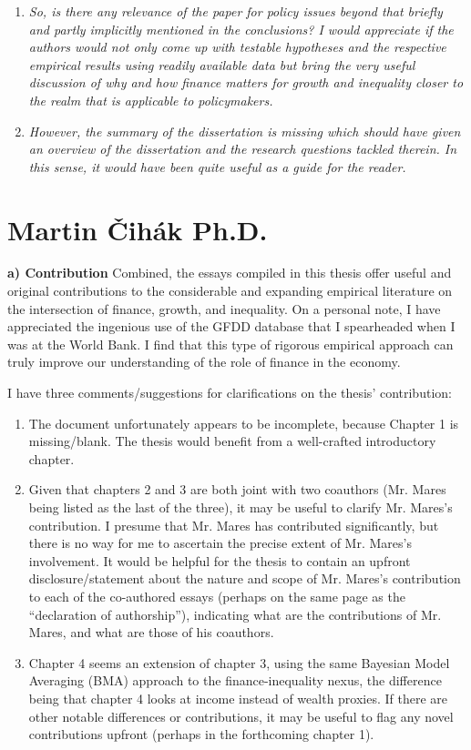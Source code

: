 \begin{enumerate}
    \item \textit{So, is there any relevance of the paper for policy issues beyond that briefly and partly implicitly mentioned in the conclusions? I would appreciate if the authors would not only come up with testable hypotheses and the respective empirical results using readily available data but bring the very useful discussion of why and how finance matters for growth and inequality closer to the realm that is applicable to policymakers.}

    \item \textit{However, the summary of the dissertation is missing which should have given an overview of the dissertation and the research questions tackled therein. In this sense, it would have been quite useful as a guide for the reader.}
\end{enumerate}

\section{Martin \v{C}ih\'{a}k Ph.D.}

\textbf{a) Contribution}
Combined, the essays compiled in this thesis offer useful and original contributions to the considerable and expanding empirical literature on the intersection of finance, growth, and inequality. On a personal note, I have appreciated the ingenious use of the GFDD database that I spearheaded when I was at the World Bank. I find that this type of rigorous empirical approach can truly improve our understanding of the role of finance in the economy.

I have three comments/suggestions for clarifications on the thesis’ contribution:

\begin{enumerate}
    \item The document unfortunately appears to be incomplete, because Chapter 1 is missing/blank. The thesis would benefit from a well-crafted introductory chapter.
    \item Given that chapters 2 and 3 are both joint with two coauthors (Mr. Mares being listed as the last of the three), it may be useful to clarify Mr. Mares’s contribution. I presume that Mr. Mares has contributed significantly, but there is no way for me to ascertain the precise extent of Mr. Mares’s involvement. It would be helpful for the thesis to contain an upfront disclosure/statement about the nature and scope of Mr. Mares’s contribution to each of the co-authored essays (perhaps on the same page as the ``declaration of authorship''), indicating what are the contributions of Mr. Mares, and what are those of his coauthors.
    \item Chapter 4 seems an extension of chapter 3, using the same Bayesian Model Averaging (BMA) approach to the finance-inequality nexus, the difference being that chapter 4 looks at income instead of wealth proxies. If there are other notable differences or contributions, it may be useful to flag any novel contributions upfront (perhaps in the forthcoming chapter 1).
\end{enumerate}

